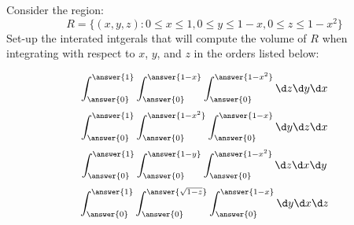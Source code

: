 \documentclass{ximera}
\author{Bart Snapp}
\begin{document}
\begin{exercise}
  Consider the region:
  \[
  R=\{(x,y,z): 0\le x\le 1, 0\le y\le 1-x, 0\le z\le 1-x^2\}
  \]
  Set-up the interated intgerals that will compute the volume of $R$
  when integrating with respect to $x$, $y$, and $z$ in the orders listed below:
  \begin{prompt}
    \[
    \int_{\answer{0}}^{\answer{1}} \int_{\answer{0}}^{\answer{1-x}} \int_{\answer{0}}^{\answer{1-x^2}}\d z \d y \d x
    \]
    \[
    \int_{\answer{0}}^{\answer{1}} \int_{\answer{0}}^{\answer{1-x^2}} \int_{\answer{0}}^{\answer{1-x}}\d y \d z \d x
    \]
    \[
    \int_{\answer{0}}^{\answer{1}} \int_{\answer{0}}^{\answer{1-y}} \int_{\answer{0}}^{\answer{1-x^2}}\d z \d x \d y
    \]
    \[
    \int_{\answer{0}}^{\answer{1}} \int_{\answer{0}}^{\answer{\sqrt{1-z}}}\int_{\answer{0}}^{\answer{1-x}}\d y \d x \d z
    \]
  \end{prompt}
\end{exercise}
\end{document}
